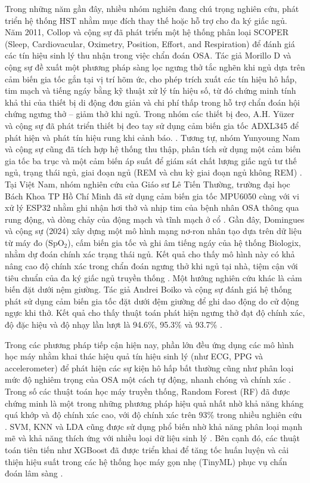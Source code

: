 Trong những năm gần đây, nhiều nhóm nghiên đang chú trọng nghiên cứu, phát
triển hệ thống HST nhằm mục đích thay thế hoặc hỗ trợ cho đa ký giấc ngủ. Năm
2011, Collop và cộng sự đã phát triển một hệ thống phân loại SCOPER (Sleep,
Cardiovacular, Oximetry, Position, Effort, and Respiration) để đánh giá các tín
hiệu sinh lý thu nhận trong việc chẩn đoán OSA\cite{hst_6p_paper}. Tác giả
Morillo D và cộng sự đề xuất một phương pháp sàng lọc ngưng thở tắc nghẽn khi
ngủ dựa trên cảm biến gia tốc gắn tại vị trí hõm ức, cho phép trích xuất các
tín hiệu hô hấp, tim mạch và tiếng ngáy bằng kỹ thuật xử lý tín hiệu số, từ đó
chứng minh tính khả thi của thiết bị di động đơn giản và chi phí thấp trong hỗ
trợ chẩn đoán hội chứng ngưng thở – giảm thở khi
ngủ\cite{morillo2010accelerometer}. Trong nhóm các thiết bị đeo, A.H. Yüzer và
cộng sự đã phát triển thiết bị đeo tay sử dụng cảm biến gia tốc ADXL345 để phát
hiện và phát tín hiệu rung khi cảnh báo. \cite{hst_wear_paper}. Tương tự, nhóm
Yunyoung Nam và cộng sự cũng đã tích hợp hệ thống thu thập, phân tích sử dụng
một cảm biến gia tốc ba trục và một cảm biến áp suất để giám sát chất lượng
giấc ngủ tư thế ngủ, trạng thái ngủ, giai đoạn ngủ (REM và chu kỳ giai đoạn ngủ
không REM) \cite{hst_pressure_paper}. Tại Việt Nam, nhóm nghiên cứu của Giáo sư
Lê Tiến Thường, trường đại học Bách Khoa TP Hồ Chí Minh đã sử dụng cảm biến gia
tốc MPU6050 cùng với vi xử lý ESP32 nhằm ghi nhận hơi thở và nhịp tim của bệnh
nhân OSA thông qua rung động, và dòng chảy của động mạch và tĩnh mạch ở cổ
\cite{thuong_wear_paper}. Gần đây, Domingues và cộng sự (2024) xây dựng một mô
hình mạng nơ-ron nhân tạo dựa trên dữ liệu từ máy đo (SpO$_2$), cấm biến gia
tốc và ghi âm tiếng ngáy của hệ thống Biologix, nhằm dự đoán chính xác trạng
thái ngủ. Kết quả cho thấy mô hình này có khả nâng cao độ chính xác trong chẩn
đoán ngưng thở khi ngủ tại nhà, tiệm cận với tiêu chuẩn của đa ký giấc ngủ
truyền thống \cite{domingues2024sleep}. Một hướng nghiên cứu khác là cảm biến
đặt dưới nệm giường. Tác giả Andrei Boiko và cộng sự đánh giá hệ thống phát sử
dụng cảm biến gia tốc đặt dưới đệm giường để ghi dao động do cử động ngực khi
thở. Kết quả cho thấy thuật toán phát hiện ngưng thở đạt độ chính xác, độ đặc
hiệu và độ nhạy lần lượt là 94.6\%, 95.3\% và 93.7\% \cite{Boiko2023}.

Trong các phương pháp tiếp cận hiện nay, phần lớn đều ứng dụng các mô hình học
máy nhằm khai thác hiệu quả tín hiệu sinh lý (như ECG, PPG và accelerometer) để
phát hiện các sự kiện hô hấp bất thường cũng như phân loại mức độ nghiêm trọng
của OSA một cách tự động, nhanh chóng và chính xác \cite{osa_sanchez2025}.
Trong số các thuật toán học máy truyền thống, Random Forest (RF) đã được chứng
minh là một trong những phương pháp hiệu quả nhất nhờ khả năng kháng quá khớp
và độ chính xác cao, với độ chính xác trên 93\% trong nhiều nghiên cứu
\cite{genuer2020random,wang2023ml_wearable}. SVM, KNN và LDA cũng được sử dụng
phổ biến nhờ khả năng phân loại mạnh mẽ và khả năng thích ứng với nhiều loại dữ
liệu sinh lý \cite{cortes1995svm, cunningham2007knn, tharwat2017lda}. Bên cạnh
đó, các thuật toán tiên tiến như XGBoost đã được triển khai để tăng tốc huấn
luyện và cải thiện hiệu suất trong các hệ thống học máy gọn nhẹ (TinyML) phục
vụ chẩn đoán lâm sàng \cite{chen2016xgboost}.

